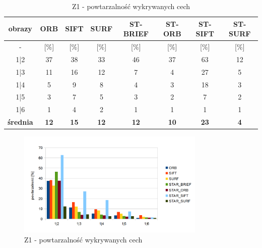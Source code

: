 \begin{table}[htbp]
  \centering
  \caption{Z1 - powtarzalność wykrywanych cech}
    \begin{tabular}{|c|c|c|c|c|c|c|c|}\hline

    obrazy & \textbf{ORB} & \textbf{SIFT} & \textbf{SURF} & \textbf{ST-BRIEF} & \textbf{ST-ORB} & \textbf{ST-SIFT} & \textbf{ST-SURF} \\\hline

    -  & [\%] & [\%] & [\%] & [\%] & [\%] & [\%] & [\%] \\\hline
    1|2 & 37 & 38 & 33 & 46 & 37 & 63 & 12 \\
    1|3 & 11 & 16 & 12 & 7 & 4 & 27 & 5 \\
    1|4 & 5 & 9 & 8 & 4 & 3 & 18 & 3 \\
    1|5 & 3 & 7 & 5 & 3 & 2 & 7 & 2 \\
    1|6 & 1 & 4 & 2 & 1 & 1 & 1 & 1 \\\hline
    \textbf{średnia} & \textbf{12} & \textbf{15} & \textbf{12} & \textbf{12} & \textbf{10} & \textbf{23} & \textbf{4} \\\hline
    
    

    \end{tabular}%
  \label{tab:z1_m1}%
\end{table}%


\begin{figure}
\centering
\includegraphics[width=0.8\textwidth]{pict/slowik/z1/m1.png}
\caption{Z1 - powtarzalność wykrywanych cech}
\label{fig:z1_m1}
\end{figure}

